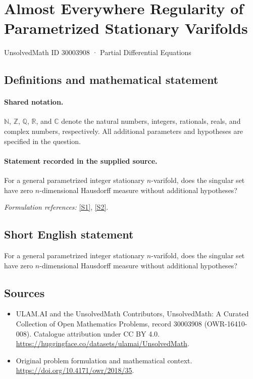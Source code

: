 \documentclass[11pt]{article}
\newcommand{\sref}[2]{\hyperlink{source:#1:#2}{[S#2]}}
\begin{document}
\setcounter{section}{30003907}
\section{Almost Everywhere Regularity of Parametrized Stationary Varifolds}\label{30003908}
{\small UnsolvedMath ID 30003908 · Partial Differential Equations}
\subsection{Definitions and mathematical statement}

\paragraph{Shared notation.}$\mathbb N$, $\mathbb Z$, $\mathbb Q$, $\mathbb R$, and $\mathbb C$ denote the natural numbers, integers, rationals, reals, and complex numbers, respectively. All additional parameters and hypotheses are specified in the question.


\paragraph{Statement recorded in the supplied source.}
For a general parametrized integer stationary $n$-varifold, does the singular set have zero $n$-dimensional Hausdorff measure without additional hypotheses?
\par\smallskip\textit{Formulation references:} \sref{30003908}{1}, \sref{30003908}{2}.
\subsection{Short English statement}
For a general parametrized integer stationary $n$-varifold, does the singular set have zero $n$-dimensional Hausdorff measure without additional hypotheses?
\subsection{Sources}
\begin{itemize}
\item[\hypertarget{source:30003908:1}{S1}] ULAM.AI and the UnsolvedMath Contributors, UnsolvedMath: A Curated Collection of Open Mathematics Problems, record 30003908 (OWR-16410-008). Catalogue attribution under CC BY 4.0.
\url{https://huggingface.co/datasets/ulamai/UnsolvedMath}.
\item[\hypertarget{source:30003908:2}{S2}] Original problem formulation and mathematical context.
\url{https://doi.org/10.4171/owr/2018/35}.
\end{itemize}
\label{end:30003908}
\end{document}
